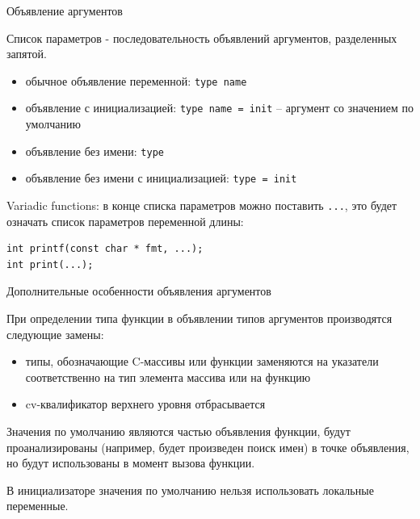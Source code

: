 \documentclass[unknownkeysallowed,xcolor=table]{beamer}
\begin{document}
\begin{frame}[fragile]{Объявление аргументов}

Список параметров - последовательность объявлений аргументов, разделенных запятой.

\begin{itemize}
  \item обычное объявление переменной: \lstinline{type name} \vspace{0.5em}
  \item объявление с инициализацией: \lstinline{type name = init} -- аргумент со значением по умолчанию \vspace{0.5em}
  \item объявление без имени: \lstinline{type} \vspace{0.5em}
  \item объявление без имени с инициализацией: \lstinline{type = init}
\end{itemize}

\vspace{0.7em}
Variadic functions: в конце списка параметров можно поставить \lstinline{...}, это будет означать список параметров переменной длины:

\begin{lstlisting}
int printf(const char * fmt, ...);
int print(...);
\end{lstlisting}

\end{frame}

\begin{frame}{Дополнительные особенности объявления аргументов}

При определении типа функции в объявлении типов аргументов производятся следующие замены:
\begin{itemize}
  \item типы, обозначающие C-массивы или функции заменяются на указатели соответственно на тип элемента массива или на функцию \vspace{0.7em}
  \item cv-квалификатор верхнего уровня отбрасывается
\end{itemize}
\vspace{0.7em}

Значения по умолчанию являются частью объявления функции, будут проанализированы (например, будет произведен поиск имен) в точке объявления, но будут использованы в момент вызова функции.\\ \vspace{0.7em}

В инициализаторе значения по умолчанию нельзя использовать локальные переменные.

\end{frame}
\end{document}
